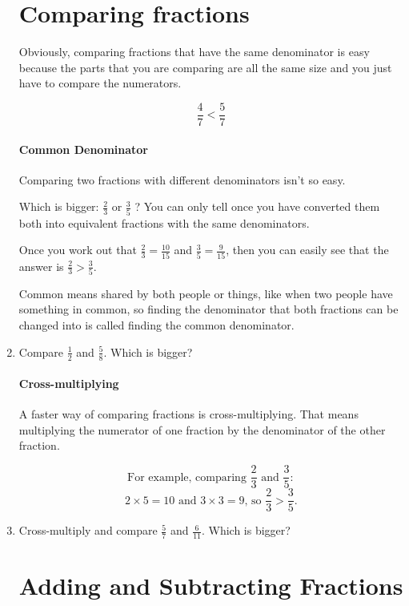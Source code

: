 \documentclass[14pt]{article}
\begin{document}
\begin{enumerate}
\newpage

\section{Comparing fractions}
Obviously, comparing fractions that have the same denominator is easy because the parts that you are comparing are all the same size and you just have to compare the numerators.

$$\frac{4}{7}<\frac{5}{7}$$

\paragraph{Common Denominator}
Comparing two fractions with different denominators isn’t so easy.

Which is bigger: $\frac{2}{3}$ or $\frac{3}{5}$ ? You can only tell once you have converted them both into equivalent fractions with the same denominators.

Once you work out that $\frac{2}{3} = \frac{10}{15}$ and $\frac{3}{5} = \frac{9}{15}$, then you can easily see that the answer is $\frac{2}{3}>\frac{3}{5}$.

Common means shared by both people or things, like when two people have something in common, so finding the denominator that both fractions can be changed into is called finding the common denominator.\\

\item Compare $\frac{1}{2}$ and $\frac{5}{8}$. Which is bigger?

\paragraph{Cross-multiplying}
A faster way of comparing fractions is cross-multiplying. That means multiplying the numerator of one fraction by the denominator of the other fraction.

$$\textrm{For example, comparing }\frac{2}{3}\textrm{ and }\frac{3}{5}:$$
$$2 \times 5 = 10\textrm{ and }3 \times 3 = 9\textrm{, so }\frac{2}{3}>\frac{3}{5}.$$

\item Cross-multiply and compare $\frac{5}{7}$ and $\frac{6}{11}$. Which is bigger?

\section{Adding and Subtracting Fractions}


\end{enumerate}
\end{document}
